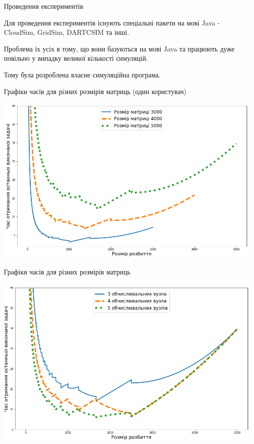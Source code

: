 \begin{frame}{Проведення експериментів}
	\manimate
	
	Для проведення експериментів існують спеціальні пакети на мові Java - CloudSim, GridSim, DARTCSIM та інші.
	
	Проблема їх усіх в тому, що вони базуються на мові Java та працюють дуже повільно у випадку великої кількості симуляцій.
	
	Тому була розроблена власне симуляційна програма.
\end{frame}

\begin{frame}{Графіки часів для різних розмірів матриць (один користувач)}
	\manimate
	
	\includegraphics[width=0.8\linewidth]{im/one_user_different_N}
\end{frame}

\begin{frame}{Графіки часів для різних розмірів матриць}
	\manimate
	
	\includegraphics[width=0.9\linewidth]{im/one_user_different_proc}
\end{frame}

